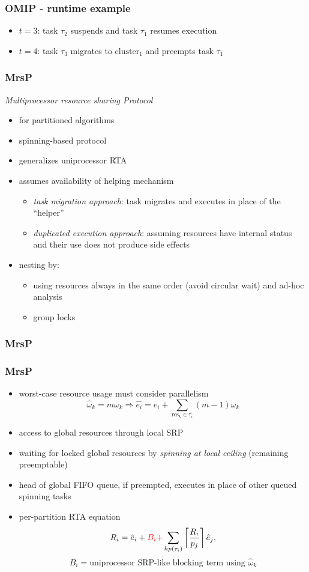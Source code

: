 \documentclass{beamer}
\begin{document}
\begin{frame}
\frametitle{OMIP - runtime example}
\centerline{}
\centerline{}
\begin{itemize}
\item $t=3$: task $\tau_2$ suspends and task $\tau_1$ resumes execution
\item $t=4$: task $\tau_3$ migrates to $\text{cluster}_1$ and preempts task $\tau_1$
\end{itemize}
\end{frame}

\begin{frame}
\frametitle{MrsP}
\emph{Multiprocessor resource sharing Protocol}
\begin{itemize}
\item for partitioned algorithms
\item spinning-based protocol
\item generalizes uniprocessor RTA
\item assumes availability of helping mechanism
  \begin{itemize}
  \item \emph{task migration approach}: task migrates and executes in place of the ``helper''
  \item \emph{duplicated execution approach}: assuming resources have internal status and their use does not produce side effects
  \end{itemize}
\item nesting by:
  \begin{itemize}
  \item using resources always in the same order (avoid circular wait) and ad-hoc analysis
  \item group locks
  \end{itemize}
\end{itemize}
\end{frame}

\begin{frame}
\frametitle{MrsP}
\centerline{}
\end{frame}

\begin{frame}
\frametitle{MrsP}
\begin{itemize}
\item worst-case resource usage must consider parallelism \[\hat{\omega}_k=m\omega_k \Rightarrow \hat{e_i}=e_i+\sum_{\text{res}_k\in\tau_i}(m-1)\omega_k\]
\item access to global resources through local SRP
\item waiting for locked global resources by \emph{spinning at local ceiling} (remaining preemptable)
\item head of global FIFO queue, if preempted, executes in place of other queued spinning tasks
\item per-partition RTA equation
\[R_i = \hat{e}_i + \textcolor{red}{B_i +} \sum_{hp(\tau_i)}\left\lceil\frac{R_i}{p_j}\right\rceil\hat{e}_j,\]
\[B_i = \text{uniprocessor SRP-like blocking term using }\hat{\omega}_k\]
\end{itemize}
\end{frame}
\end{document}
